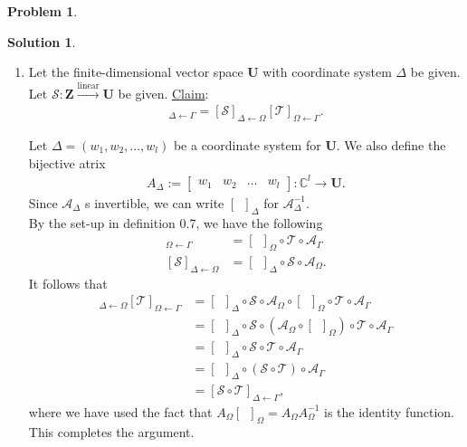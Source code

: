 \documentclass{article}
\theoremstyle{definition}
\newtheorem*{prob*}{Problem}
\newtheorem*{sln*}{Solution}
\newcommand{\Z}{\mathbf{Z}}
\newcommand{\U}{\mathbf{U}}
\newcommand{\lin}{\overset{\text{linear}}{\longrightarrow}}
\newcommand{\T}{\mathcal{T}}
\begin{document}
\begin{prob*}
\begin{sln*}
\begin{enumerate}
 			
 			
 			
 			
 			\item Let the finite-dimensional vector space $\U$ with coordinate system $\Delta$ be given. Let $\mathcal{S}:\Z \lin \U$ be given. \underline{Claim}:
			\begin{align*}
 			[\mathcal{S} \circ \T]_{\Delta\leftarrow\Gamma} = [\mathcal{S}]_{\Delta\leftarrow\Omega}[\T]_{\Omega\leftarrow\Gamma}.
 			\end{align*}
 			
 			Let $\Delta = (w_1,w_2,\dots,w_l)$ be a coordinate system for $\U$. We also define the bijective atrix
 			\begin{align*}
 			A_\Delta := \begin{bmatrix}
 			w_1&w_2&\dots&w_l
 			\end{bmatrix} : \mathbb{C}^l \rightarrow \U.
 			\end{align*}
 			Since $\mathcal{A}_\Delta$ s invertible, we can write $[\,\,\,]_\Delta$ for $\mathcal{A}^{-1}_\Delta$. \\
 			
			By the set-up in definition 0.7, we have the following
			\begin{align*}
			[\T]_{\Omega\leftarrow \Gamma} &= [\,\,\,]_\Omega\circ \T\circ \mathcal{A}_\Gamma\\
			[\mathcal{S}]_{\Delta\leftarrow\Omega} &= [\,\,\,]_\Delta \circ \mathcal{S} \circ \mathcal{A}_\Omega.			
			\end{align*}
 			It follows that
 			\begin{align*}
 			[\mathcal{S}]_{\Delta \leftarrow \Omega}[\mathcal{T}]_{\Omega\leftarrow\Gamma}
			&= [\,\,\,]_\Delta \circ \mathcal{S} \circ \mathcal{A}_\Omega \circ [\,\,\,]_\Omega\circ \T\circ \mathcal{A}_\Gamma\\
			&= [\,\,\,]_\Delta \circ \mathcal{S} \circ \left( \mathcal{A}_\Omega \circ [\,\,\,]_\Omega \right) \circ \T\circ \mathcal{A}_\Gamma\\
			&= [\,\,\,]_\Delta \circ \mathcal{S} \circ \T\circ \mathcal{A}_\Gamma\\
			&= [\,\,\,]_\Delta \circ \left(\mathcal{S} \circ \T \right) \circ \mathcal{A}_\Gamma\\
			&= [\mathcal{S}\circ \T]_{\Delta \leftarrow \Gamma},
 			\end{align*}
			where we have used the fact that $A_\Omega [\,\,\,]_\Omega = A_\Omega A_\Omega^{-1}$ is the identity function. This completes the argument. \\
			

\end{enumerate}
\end{sln*}
\end{prob*}
\end{document}

